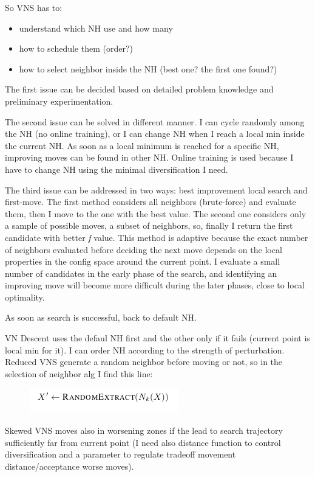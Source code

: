 \documentclass[10pt]{article}
\begin{document}
So VNS has to:

\begin{itemize}
\item understand which NH use and how many
\item how to schedule them (order?)
\item how to select neighbor inside the NH (best one? the first one found?)
\end{itemize}

The first issue can be decided based on detailed problem knowledge and preliminary experimentation.

The second issue can be solved in different manner. I can cycle randomly among the NH (no online training), or I can change NH when I reach a local min inside the current NH. 
As soon as a local minimum is reached for a specific NH, improving moves can be found in other NH. Online training is used because I have to change NH using the minimal diversification I need.

The third issue can be addressed in two ways: best improvement local search and first-move. The first method considers all neighbors (brute-force) and evaluate them, then I move to the one with the best value. The second one considers only a sample of possible moves, a subset of neighbors, so, finally I return the first candidate with better \textit{f} value. This method is adaptive because the exact number of neighbors evaluated before deciding the next move depends on the local properties in the config space around the current point.
I evaluate a small number of candidates in the early phase of the search, and identifying
an improving move will become more difficult during the later phases, close to local optimality.

As soon as search is successful, back to default NH.

VN Descent uses the defaul NH first and the other only if it fails (current point is local min for it). I can order NH according to the strength of perturbation.
Reduced VNS generate a random neighbor before moving or not, so in the selection of neighbor alg I find this line:

\begin{figure}[H]
\includegraphics[scale=0.60]{random}
\centering
\end{figure}

Skewed VNS moves also in worsening zones if the lead to search trajectory sufficiently far from current point (I need also distance function to control diversification and a parameter to regulate tradeoff movement distance/acceptance worse moves).
\end{document}
